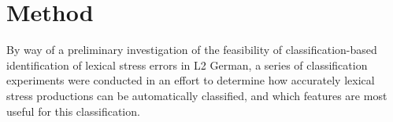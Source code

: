 \documentclass[a4paper]{article}
\newcommand{\TODO}[1]{{\color{red}\textbf{[TODO #1]}}}
\begin{document}
		
		
	
	
	
	\section{Method}
	\label{sec:method}
	
	By way of a preliminary investigation of the feasibility of 
	classification-based identification of lexical stress errors in L2 German,
	a series of classification experiments were conducted in an effort to determine
	 how accurately lexical stress productions can be automatically classified, 
	and
	 which features 
	 are most useful for this classification.
	
\end{document}
